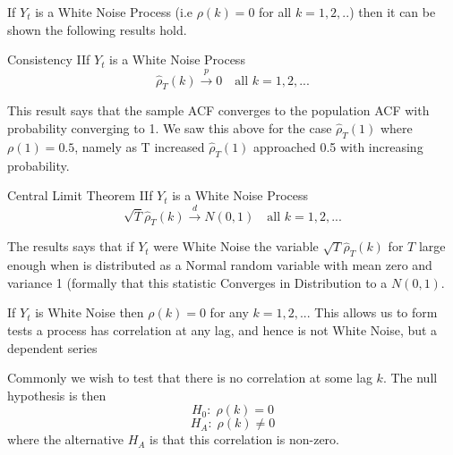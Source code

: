 \documentclass[openany]{tufte-book} %
\begin{document}
If $Y_t$ is a White Noise Process (i.e $\rho(k)=0$ for all $k=1,2,..$) then it can be shown the following results hold.
\begin{mytheo}{Consistency}  IIf $Y_t$ is a White Noise Process
	\begin{equation*}
	\hat{\rho}_T(k)\overset{p}{\rightarrow} 0\quad \text{all }%
	k=1, 2,...  \label{autocorr cons}
	\end{equation*} \end{mytheo}
This  result says that the sample ACF converges to the population ACF with probability converging to 1. We saw this above for the case $\hat{\rho}_T(1)$ where $\rho(1)=0.5$, namely as T increased  $\hat{\rho}_T(1)$ approached 0.5 with increasing probability.
\begin{mytheo}{Central Limit Theorem}  IIf $Y_t$ is a White Noise Process
	\begin{equation*}
\sqrt{T}\hat{\rho}_T(k)\overset{d}{\rightarrow}N\left( 0,1\right) \quad \text{all }%
k=1, 2,...  \label{autocorr distn}
\end{equation*} \end{mytheo}


 The results says that if $Y_t$ were White Noise the variable $\sqrt{T}\hat{\rho}_T(k)$ for $T$ large enough when is distributed as a Normal random variable with mean zero and variance 1 (formally that this statistic Converges in Distribution to a $N(0,1)$.
 	
 	If $Y_t$ is White Noise then $\rho(k)=0$ for any $k=1,2,..$. This allows us to form tests a process has correlation at any lag, and hence is not White Noise, but a dependent series
 	
 Commonly we wish to test that there is no correlation at some lag $k$. The null hypothesis is then
\begin{equation*} H_0:\;  \rho(k)=0 \end{equation*}
\begin{equation*} H_A:\;  \rho(k)\neq 0 \end{equation*}
where the alternative $H_A$ is that this correlation is non-zero.
\end{document}
